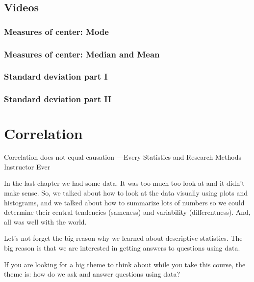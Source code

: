 \documentclass[]{book}
\begin{document}
\hypertarget{videos}{%
\section{Videos}\label{videos}}

\hypertarget{measures-of-center-mode}{%
\subsection{Measures of center: Mode}\label{measures-of-center-mode}}

\hypertarget{measures-of-center-median-and-mean}{%
\subsection{Measures of center: Median and Mean}\label{measures-of-center-median-and-mean}}

\hypertarget{standard-deviation-part-i}{%
\subsection{Standard deviation part I}\label{standard-deviation-part-i}}

\hypertarget{standard-deviation-part-ii}{%
\subsection{Standard deviation part II}\label{standard-deviation-part-ii}}

\hypertarget{Correlation}{%
\chapter{Correlation}\label{Correlation}}

{
Correlation does not equal causation
---Every Statistics and Research Methods Instructor Ever
}

In the last chapter we had some data. It was too much too look at and it didn't make sense. So, we talked about how to look at the data visually using plots and histograms, and we talked about how to summarize lots of numbers so we could determine their central tendencies (sameness) and variability (differentness). And, all was well with the world.

Let's not forget the big reason why we learned about descriptive statistics. The big reason is that we are interested in getting answers to questions using data.

If you are looking for a big theme to think about while you take this course, the theme is: how do we ask and answer questions using data?
\end{document}
